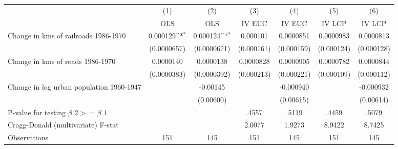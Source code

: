 {
\def\sym#1{\ifmmode^{#1}\else\(^{#1}\)\fi}
\begin{tabular}{l*{6}{c}}
\hline\hline
                &\multicolumn{1}{c}{(1)}&\multicolumn{1}{c}{(2)}&\multicolumn{1}{c}{(3)}&\multicolumn{1}{c}{(4)}&\multicolumn{1}{c}{(5)}&\multicolumn{1}{c}{(6)}\\
                &\multicolumn{1}{c}{OLS}&\multicolumn{1}{c}{OLS}&\multicolumn{1}{c}{IV EUC}&\multicolumn{1}{c}{IV EUC}&\multicolumn{1}{c}{IV LCP}&\multicolumn{1}{c}{IV LCP}\\
\hline
Change in kms of railroads 1986-1970& 0.000129\sym{*}  & 0.000124\sym{*}  & 0.000101         &0.0000851         &0.0000983         &0.0000813         \\
                &(0.0000657)         &(0.0000671)         &(0.000161)         &(0.000159)         &(0.000124)         &(0.000128)         \\
[1em]
Change in kms of roads 1986-1970&0.0000140         &0.0000138         &0.0000828         &0.0000905         &0.0000782         &0.0000844         \\
                &(0.0000383)         &(0.0000392)         &(0.000213)         &(0.000221)         &(0.000109)         &(0.000112)         \\
[1em]
Change in log urban population 1960-1947&                  & -0.00145         &                  &-0.000940         &                  &-0.000932         \\
                &                  &(0.00600)         &                  &(0.00615)         &                  &(0.00614)         \\
\hline
P-value for testing $\beta\_{2} >= \beta\_{1}$&                  &                  &    .4557         &    .5119         &    .4459         &    .5079         \\
Cragg-Donald (multivariate) F-stat&                  &                  &   2.0077         &   1.9273         &   8.9422         &   8.7425         \\
Observations    &      151         &      145         &      151         &      145         &      151         &      145         \\
\hline\hline
\end{tabular}
}
